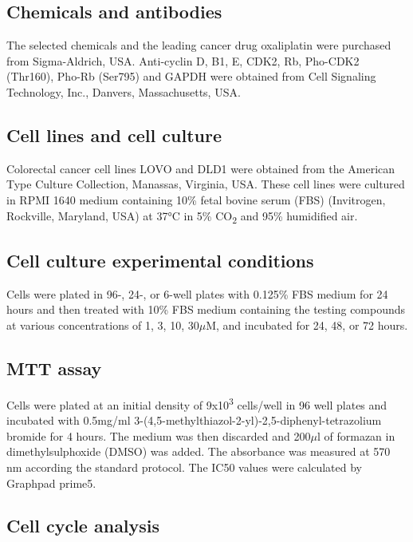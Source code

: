 \subsection{Chemicals and antibodies}

The selected chemicals and the leading cancer drug oxaliplatin were purchased from Sigma-Aldrich, USA. Anti-cyclin D, B1, E, CDK2, Rb, Pho-CDK2 (Thr160), Pho-Rb (Ser795) and GAPDH were obtained from Cell Signaling Technology, Inc., Danvers, Massachusetts, USA.

\subsection{Cell lines and cell culture}

Colorectal cancer cell lines LOVO and DLD1 were obtained from the American Type Culture Collection, Manassas, Virginia, USA. These cell lines were cultured in RPMI 1640 medium containing 10\% fetal bovine serum (FBS) (Invitrogen, Rockville, Maryland, USA) at 37°C in 5\% CO\textsubscript{2} and 95\% humidified air.

\subsection{Cell culture experimental conditions}

Cells were plated in 96-, 24-, or 6-well plates with 0.125\% FBS medium for 24 hours and then treated with 10\% FBS medium containing the testing compounds at various concentrations of 1, 3, 10, 30$\mu$M, and incubated for 24, 48, or 72 hours.

\subsection{MTT assay}

Cells were plated at an initial density of 9x10\textsuperscript{3} cells/well in 96 well plates and incubated with 0.5mg/ml 3-(4,5-methylthiazol-2-yl)-2,5-diphenyl-tetrazolium bromide for 4 hours. The medium was then discarded and 200$\mu$l of formazan in dimethylsulphoxide (DMSO) was added. The absorbance was measured at 570 nm according the standard protocol. The IC50 values were calculated by Graphpad prime5.

\subsection{Cell cycle analysis}

